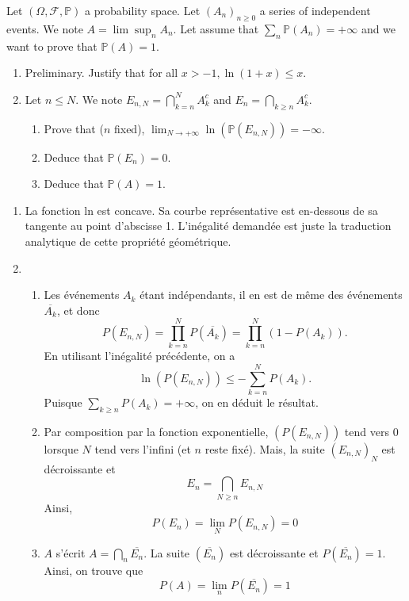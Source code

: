 \begin{Exercise}
  Let $(\Omega, \mathcal{F}, \mathbb{P})$ a probability space. Let ${\left(A_n\right)}_{n \geq 0}$ a series of independent events. We note $A=\lim \sup _n A_n$. Let assume that $\sum_n \mathbb{P}\left(A_n\right)=+\infty$ and we want to prove that $\mathbb{P}(A)=1$.
  \begin{enumerate}
    \item Preliminary. Justify that for all $x>-1, \ln (1+x) \leq x$.
    \item Let $n \leq N$. We note $E_{n, N}=\bigcap_{k=n}^N A_k^c$ and $E_n=\bigcap_{k \geq n} A_k^c$.
          \begin{enumerate}
            \item Prove that ($n$ fixed), $\lim _{N \rightarrow+\infty} \ln \left(\mathbb{P}\left(E_{n, N}\right)\right)=-\infty$.
            \item Deduce that $\mathbb{P}\left(E_n\right)=0$.
            \item Deduce that $\mathbb{P}(A)=1$.
          \end{enumerate}
  \end{enumerate}
\end{Exercise}

\begin{solution}
  \begin{enumerate}
    \item La fonction ln est concave. Sa courbe représentative est en-dessous de sa tangente au point d'abscisse 1. L'inégalité demandée est juste la traduction analytique de cette propriété géométrique.
    \item \begin{enumerate}
            \item Les événements $A_k$ étant indépendants, il en est de même des événements $\overline{A_k}$, et donc
                  \[
                    P\left(E_{n, N}\right)=\prod_{k=n}^N P\left(\overline{A_k}\right)=\prod_{k=n}^N\left(1-P\left(A_k\right)\right) .
                  \]
                  En utilisant l'inégalité précédente, on a
                  \[
                    \ln \left(P\left(E_{n, N}\right)\right) \leq-\sum_{k=n}^N P\left(A_k\right) .
                  \]
                  Puisque $\sum_{k \geq n} P\left(A_k\right)=+\infty$, on en déduit le résultat.
            \item Par composition par la fonction exponentielle, $\left(P\left(E_{n, N}\right)\right)$ tend vers 0 lorsque $N$ tend vers l'infini (et $n$ reste fixé). Mais, la suite ${\left(E_{n, N}\right)}_N$ est décroissante et
                  \[
                    E_n=\bigcap_{N \geq n} E_{n, N}
                  \]
                  Ainsi,
                  \[
                    P\left(E_n\right)=\lim _N P\left(E_{n, N}\right)=0
                  \]
            \item $A$ s'écrit $A=\bigcap_n \overline{E_n}$. La suite $\left(\overline{E_n}\right)$ est décroissante et $P\left(\overline{E_n}\right)=1$. Ainsi, on trouve que
                  \[
                    P(A)=\lim _n P\left(\overline{E_n}\right)=1
                  \]
          \end{enumerate}
  \end{enumerate}
\end{solution}
